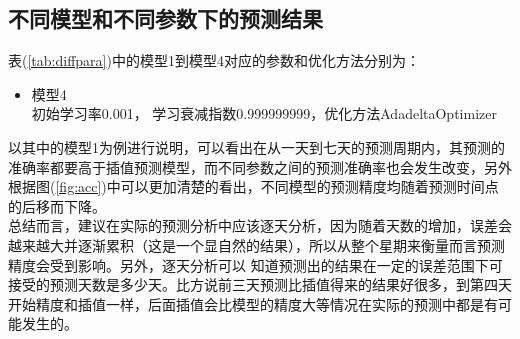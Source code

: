 \subsection{不同模型和不同参数下的预测结果}
表(\ref{tab:diffpara})中的模型1到模型4对应的参数和优化方法分别为：
\begin{itemize}
	\\ 初始学习率为0.1，学习衰减指数0.95，优化方法AdadeltaOptimizer
	 \\初始学习率0.01，学习衰减指数1， 优化方法GradientDescentOptimizer (该优化方法在本模型很容易不收敛)
	\\ 初始学习率0.01， 学习衰减指数0.999，优化方法AdadeltaOptimizer
	\item 模型4 \\初始学习率0.001， 学习衰减指数0.999999999，优化方法AdadeltaOptimizer
\end{itemize}
\indent 以其中的模型1为例进行说明，可以看出在从一天到七天的预测周期内，其预测的准确率都要高于插值预测模型，而不同参数之间的预测准确率也会发生改变，另外根据图(\ref{fig:acc})中可以更加清楚的看出，不同模型的预测精度均随着预测时间点的后移而下降。\\
\indent 总结而言，建议在实际的预测分析中应该逐天分析，因为随着天数的增加，误差会越来越大并逐渐累积（这是一个显自然的结果），所以从整个星期来衡量而言预测精度会受到影响。另外，逐天分析可以
知道预测出的结果在一定的误差范围下可接受的预测天数是多少天。比方说前三天预测比插值得来的结果好很多，到第四天开始精度和插值一样，后面插值会比模型的精度大等情况在实际的预测中都是有可能发生的。
